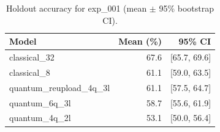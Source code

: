 \begin{table}[ht]
\centering
\caption{Holdout accuracy for exp_001 (mean $\pm$ 95\% bootstrap CI).}
\label{tab:exp_001}
\begin{tabular}{lrr}
\toprule
Model & Mean (\%) & 95\% CI \\
\midrule
classical\_32 & 67.6 & [65.7, 69.6] \\
classical\_8 & 61.1 & [59.0, 63.5] \\
quantum\_reupload\_4q\_3l & 61.1 & [57.5, 64.7] \\
quantum\_6q\_3l & 58.7 & [55.6, 61.9] \\
quantum\_4q\_2l & 53.1 & [50.0, 56.4] \\
\bottomrule
\end{tabular}
\end{table}
